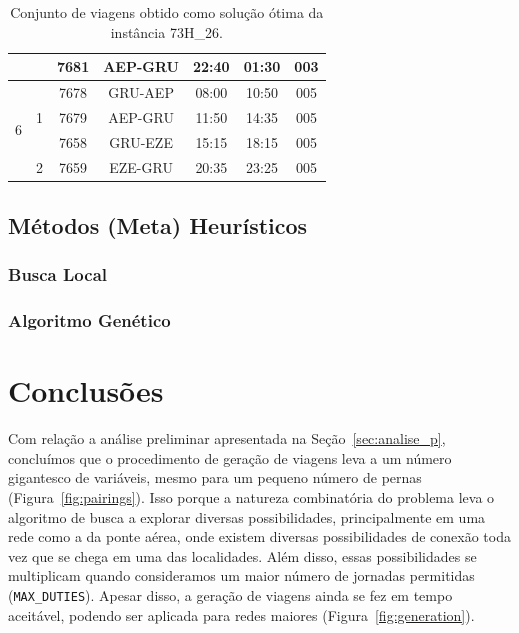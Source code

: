 \documentclass[12pt,a4paper]{article}
\newcommand{\zerar}{\setcounter{equation}{0}\setcounter{figure}{0}\setcounter{table}{0}}
\begin{document}
\begin{table}[!htb]
\begin{center}
\begin{tabular}{|c|c|ccccc|}
			&	&	7681 & AEP-GRU & 22:40 & 01:30 & 003 \\ \hline \hline
			\multirow{4}{*}{6} & \multirow{3}{*}{1}  
				& 7678 & GRU-AEP & 08:00 & 10:50 & 005 \\
			& & 7679 & AEP-GRU & 11:50 & 14:35 & 005 \\
			&	& 7658 & GRU-EZE & 15:15 & 18:15 & 005 \\ \cline{2-7}
                           	 & \multirow{1}{*}{2}
				& 7659 & EZE-GRU & 20:35 & 23:25 & 005 \\ \hline
		\end{tabular}
		\caption{Conjunto de viagens obtido como solução ótima da instância 73H\_26.}
		\label{tab:pairings}
	\end{center}
\end{table}
			                               

\subsection{Métodos (Meta) Heurísticos}
\label{sec:resultados_heuristicas}


\subsubsection{Busca Local}
\label{sec:resultados_busca}


\subsubsection{Algoritmo Genético}
\label{sec:resultados_genetico}


\zerar
\section{Conclusões}
\label{sec:conclusoes}

Com relação a análise preliminar apresentada na Seção~\ref{sec:analise_p}, concluímos que o
procedimento de geração de viagens leva a um número gigantesco de variáveis, mesmo para um pequeno
número de pernas (Figura~\ref{fig:pairings}). Isso porque a natureza combinatória do problema leva o
algoritmo de busca a explorar diversas possibilidades, principalmente em uma rede como a da ponte
aérea, onde existem diversas possibilidades de conexão toda vez que se chega em uma das localidades.
Além disso, essas possibilidades se multiplicam quando consideramos um maior número de jornadas
permitidas (\verb|MAX_DUTIES|). Apesar disso, a geração de viagens ainda se fez em tempo aceitável,
podendo ser aplicada para redes maiores (Figura~\ref{fig:generation}).
\end{document}
